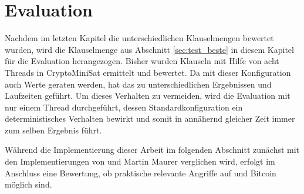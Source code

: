 \chapter{Evaluation}
\label{chp:evaluation}

Nachdem im letzten Kapitel die unterschiedlichen Klauselmengen bewertet wurden, wird die Klauselmenge aus Abschnitt \ref{sec:test_beste}
in diesem Kapitel für die Evaluation herangezogen. Bisher wurden Klauseln mit Hilfe von acht Threads in CryptoMiniSat ermittelt und bewertet.
Da mit dieser Konfiguration auch Werte geraten werden, hat das zu unterschiedlichen Ergebnissen und Laufzeiten geführt. Um dieses Verhalten
zu vermeiden, wird die Evaluation mit nur einem Thread durchgeführt, dessen Standardkonfiguration ein deterministisches Verhalten bewirkt
und somit in annähernd gleicher Zeit immer zum selben Ergebnis führt.

Während die Implementierung dieser Arbeit im folgenden Abschnitt zunächst mit den Implementierungen von  und Martin Maurer verglichen wird,
erfolgt im Anschluss eine Bewertung, ob praktische relevante Angriffe auf  und Bitcoin möglich sind.



